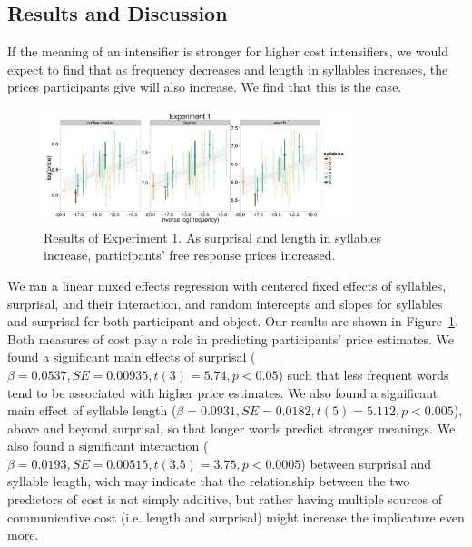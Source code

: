 \documentclass[10pt,letterpaper]{article}
\begin{document}
\subsection{Results and Discussion}

If the meaning of an intensifier is stronger for higher cost intensifiers, we would expect to find that as frequency decreases and length in syllables increases, the prices participants give will also increase. We find that this is the case.

\begin{figure}[ht]
\begin{center}
\includegraphics[width=0.8\textwidth]{analysis_files_for_writeup/images/exp1-plot.png}
\end{center}
\caption{Results of Experiment 1. As surprisal and length in syllables increase, participants' free response prices increased.} 
\label{exp1-plot}
\end{figure}

We ran a linear mixed effects regression with centered fixed effects of syllables, surprisal, and their interaction, and random intercepts and slopes for syllables and surprisal for both participant and object.
Our results are shown in Figure~\ref{exp1-plot}. Both measures of cost play a role in predicting participants' price estimates. We found a significant main effects of surprisal ($\beta=0.0537, SE=0.00935, t(3)=5.74, p<0.05$) such that less frequent words tend to be associated with higher price estimates. We also found a significant main effect of syllable length ($\beta=0.0931, SE=0.0182, t(5)=5.112, p<0.005$), above and beyond surprisal, so that longer words predict stronger meanings. We also found a significant interaction ($\beta=0.0193, SE=0.00515, t(3.5)=3.75, p<0.0005$) between surprisal and syllable length, wich may indicate that the relationship between the two predictors of cost is not simply additive, but rather having multiple sources of communicative cost (i.e. length and surprisal) might increase the implicature even more.
\end{document}
